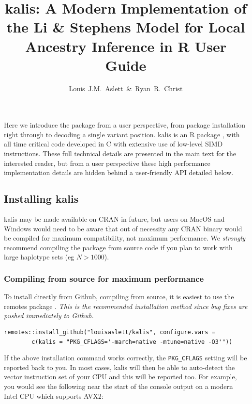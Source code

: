 \documentclass[a4paper]{article}
\title{kalis: A Modern Implementation of the Li \& Stephens Model for Local Ancestry Inference in R \newline User Guide}
\author{Louis~J.M.~Aslett~\&~Ryan~R.~Christ}
\date{}
\let\proglang=\textsf
\newcommand{\pkg}[1]{{\fontseries{m}\fontseries{b}\selectfont #1}}
\begin{document}
\maketitle



Here we introduce the package from a user perspective, from package installation right through to decoding a single variant position.
\pkg{kalis} is an \proglang{R} package \cite{R}, with all time critical code developed in \proglang{C} \cite{C18} with extensive use of low-level SIMD instructions.
These full technical details are presented in the main text for the interested reader, but from a user perspective these high performance implementation details are hidden behind a user-friendly API detailed below.



\subsection*{Installing \pkg{kalis}}
\label{sec:installing}

\pkg{kalis} may be made available on CRAN in future, but users on MacOS and Windows would need to be aware that out of necessity any CRAN binary would be compiled for maximum compatibility, not maximum performance.
We \emph{strongly} recommend compiling the package from source code if you plan to work with large haplotype sets (eg \(N > 1000\)).



\subsubsection*{Compiling from source for maximum performance}
\label{compiling-from-source-for-maximum-performance}

To install directly from Github, compiling from source, it is easiest to use the \pkg{remotes} package \cite{remotes}.
\emph{This is the	recommended installation method since bug fixes are pushed immediately to Github.}

\begin{verbatim}
remotes::install_github("louisaslett/kalis", configure.vars =
        c(kalis = "PKG_CFLAGS='-march=native -mtune=native -O3'"))
\end{verbatim}

If the above installation command works correctly, the \texttt{PKG\_CFLAGS} setting will be reported back to you.
In most cases, \pkg{kalis} will then be able to auto-detect the vector instruction set of your CPU and this will be reported too.
For example, you would see the following near the start of the console output on a modern Intel CPU which supports AVX2:
\end{document}
